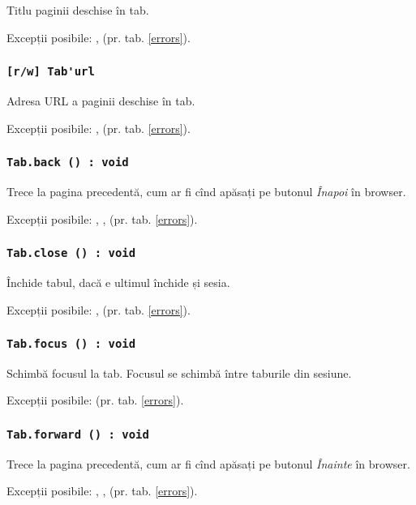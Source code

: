 Titlu paginii deschise în tab.

Excepții posibile: ,  (pr. tab. \ref{errors}).

\subsubsection{\lstinline|[r/w] Tab'url|}

Adresa URL a paginii deschise în tab.

Excepții posibile: ,  (pr. tab. \ref{errors}).

\subsubsection{\lstinline|Tab.back () : void|}

Trece la pagina precedentă, cum ar fi cînd apăsați pe butonul \textit{Înapoi} în browser.

Excepții posibile: , ,  (pr. tab. \ref{errors}).

\subsubsection{\lstinline|Tab.close () : void|}

Închide tabul, dacă e ultimul închide și sesia.

Excepții posibile: ,  (pr. tab. \ref{errors}).

\subsubsection{\lstinline|Tab.focus () : void|}

Schimbă focusul la tab. Focusul se schimbă între taburile din sesiune.

Excepții posibile:  (pr. tab. \ref{errors}).

\subsubsection{\lstinline|Tab.forward () : void|}

Trece la pagina precedentă, cum ar fi cînd apăsați pe butonul \textit{Înainte} în browser.


Excepții posibile: , ,  (pr. tab. \ref{errors}).


